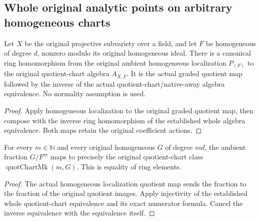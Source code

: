 \subsection{Whole original analytic points on arbitrary homogeneous charts}

\begin{definition}
\label{projective:actual-admissible-ambient-fraction-hom}
\leanok
{}
Let $X$ be the original projective subvariety over a field, and let $F$ be
homogeneous of degree $d$, nonzero modulo its original homogeneous ideal.
There is a canonical ring homomorphism from the original ambient homogeneous
localization $P_{(F)}$ to the original quotient-chart algebra $A_{X,F}$.
It is the actual graded quotient map followed by the inverse of the actual
quotient-chart/native-away algebra equivalence. No normality assumption is used.
\end{definition}
\begin{proof}
Apply homogeneous localization to the original graded quotient map, then
compose with the inverse ring homomorphism of the established whole algebra
equivalence. Both maps retain the original coefficient actions.
\end{proof}

\begin{lemma}
\label{projective:actual-admissible-ambient-fraction-numerator}
\leanok
{}
For every $m\in\mathbb N$ and every original homogeneous $G$ of degree $md$,
the ambient fraction $G/F^m$ maps to precisely the original quotient-chart
class $\operatorname{quotChartMk}(m,G)$. This is equality of ring elements.
\end{lemma}
\begin{proof}
The actual homogeneous localization quotient map sends the fraction to the
fraction of the original quotient images. Apply injectivity of the established
whole quotient-chart equivalence and its exact numerator formula. Cancel the
inverse equivalence with the equivalence itself.
\end{proof}

